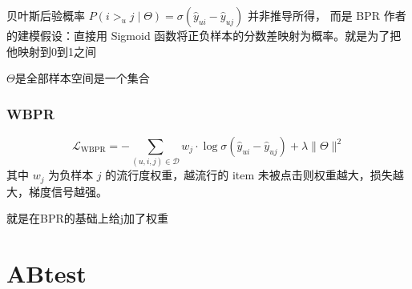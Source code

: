 \begin{note}
贝叶斯后验概率 $P(i >_u j \mid \Theta) = \sigma(\hat{y}_{ui} - \hat{y}_{uj})$ 并非推导所得，
而是 BPR 作者的建模假设：直接用 Sigmoid 函数将正负样本的分数差映射为概率。就是为了把他映射到0到1之间
\end{note}
\begin{note}
    $\Theta$是全部样本空间是一个集合
\end{note}
\subsection{WBPR}
\begin{definition}[WBPR损失函数]
$$
\mathcal{L}_{\text{WBPR}} = -\sum_{(u,i,j) \in \mathcal{D}} w_j \cdot \log \sigma(\hat{y}_{ui} - \hat{y}_{uj}) + \lambda\|\Theta\|^2
$$
其中 $w_j$ 为负样本 $j$ 的流行度权重，越流行的 item 未被点击则权重越大，损失越大，梯度信号越强。
\end{definition}
就是在BPR的基础上给j加了权重
\chapter{ABtest}
